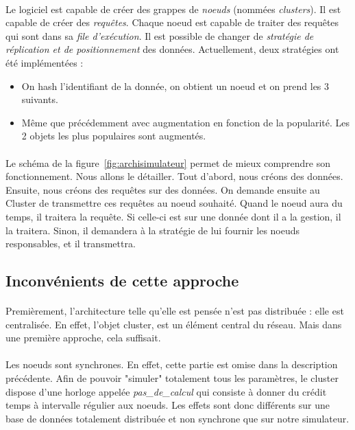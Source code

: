 \documentclass[12pt]{article}
\begin{document}
\paragraph{}Le logiciel est capable de créer des grappes de \textit{noeuds} (nommées \textit{clusters}). Il est capable de créer des \textit{requêtes}. Chaque noeud est capable de traiter des requêtes qui sont dans sa \textit{file d'exécution}. Il est possible de changer de \textit{stratégie de réplication et de positionnement} des données. Actuellement, deux stratégies ont été implémentées :

\begin{itemize}
    \item On hash l'identifiant de la donnée, on obtient un noeud et on prend les 3 suivants.
    \item Même que précédemment avec augmentation en fonction de la popularité. Les 2 objets les plus populaires sont augmentés.
\end{itemize}

\paragraph{}Le schéma de la figure~\ref{fig:archisimulateur} permet de mieux comprendre son fonctionnement. Nous allons le détailler. \newline
Tout d'abord, nous créons des données. Ensuite, nous créons des requêtes sur des données. On demande ensuite au Cluster de transmettre ces requêtes au noeud souhaité. Quand le noeud aura du temps, il traitera la requête. Si celle-ci est sur une donnée dont il a la gestion, il la traitera. Sinon, il demandera à la stratégie de lui fournir les noeuds responsables, et il transmettra.

\subsection{Inconvénients de cette approche}

\paragraph{}Premièrement, l'architecture telle qu'elle est pensée n'est pas distribuée : elle est centralisée. En effet, l'objet cluster, est un élément central du réseau. Mais dans une première approche, cela suffisait.

\paragraph{}Les noeuds sont synchrones. En effet, cette partie est omise dans la description précédente. Afin de pouvoir "simuler" totalement tous les paramètres, le cluster dispose d'une horloge appelée \textit{pas\_de\_calcul} qui consiste à donner du crédit temps à intervalle régulier aux noeuds. Les effets sont donc différents sur une base de données totalement distribuée et non synchrone que sur notre simulateur.
\end{document}
